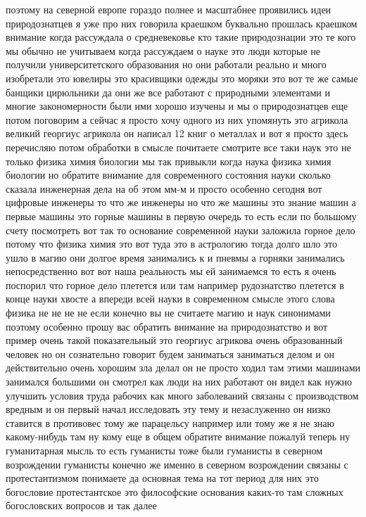 поэтому на
северной европе гораздо полнее и масштабнее проявились идеи природознатцев я уже
про них говорила краешком буквально прошлась краешком внимание когда рассуждала
о средневековье кто такие природознации это те кого мы обычно не учитываем когда
рассуждаем о науке это люди которые не получили университетского образования но
они работали реально и много изобретали это ювелиры это красивщики одежды это
моряки это вот те же самые банщики цирюльники да они же все работают с
природными элементами и многие закономерности были ими хорошо изучены и мы о
природознатцев еще потом поговорим а сейчас я просто хочу одного из них
упомянуть это агрикола великий георгиус агрикола он написал 12 книг о металлах и
вот я просто здесь перечисляю потом обработки в смысле почитаете смотрите все
таки наук это не только физика химия биологии мы так привыкли когда наука физика
химия биологии но обратите внимание для современного состояния науки сколько
сказала инженерная дела на об этом мм-м и просто особенно сегодня вот цифровые
инженеры то что же инженеры но что же машины это знание машин а первые машины
это горные машины в первую очередь то есть если по большому счету посмотреть вот
так то основание современной науки заложила горное дело потому что физика химия
это вот туда это в астрологию тогда долго шло это ушло в магию они долгое время
занимались к и пневмы а горняки занимались непосредственно вот вот наша
реальность мы ей занимаемся то есть я очень поспорил что горное дело плетется
или там например рудознатство плетется в конце науки хвосте а впереди всей науки
в современном смысле этого слова физика не не не не если конечно вы не считаете
магию и наук синонимами поэтому особенно прошу вас обратить внимание на
природознатство и вот пример очень такой показательный это георгиус агрикова
очень образованный человек но он сознательно говорит будем заниматься заниматься
делом и он действительно очень хорошим зла делал он не просто ходил там этими
машинами занимался большими он смотрел как люди на них работают он видел как
нужно улучшить условия труда рабочих как много заболеваний связаны с
производством вредным и он первый начал исследовать эту тему и незаслуженно он
низко ставится в противовес тому же парацельсу например или тому же я не знаю
какому-нибудь там ну кому еще в общем обратите внимание пожалуй теперь ну
гуманитарная мысль то есть гуманисты тоже были гуманисты в северном возрождении
гуманисты конечно же именно в северном возрождении связаны с протестантизмом
понимаете да основная тема на тот период для них это богословие протестантское
это философские основания каких-то там сложных богословских вопросов и так далее
